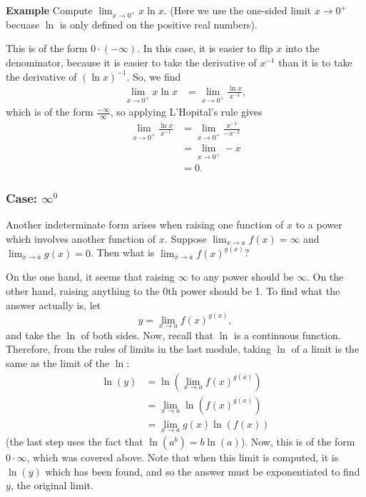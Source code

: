 \documentclass[twoside,openright,titlepage,a4paper]{book}
\begin{document}
\begin{sloppypar}
\textbf{Example} Compute $\displaystyle \lim_{x \rightarrow 0^+} x \ln x$. (Here we use the one-sided limit $x \rightarrow 0^+$ becuase $\ln$ is only defined on the positive real numbers).
\begin{examplebox}
This is of the form $0 \cdot (-\infty)$. In this case, it is easier to flip $x$ into the denominator, because it is easier to take the derivative of $x^{-1}$ than it is to take the derivative of $(\ln x)^{-1}$. So, we find
\begin{align*}
\lim_{x \rightarrow 0^+} x \ln x &= \lim_{x \rightarrow 0^+} \frac{ \ln x}{x^{-1}},
\end{align*}
which is of the form $\frac{-\infty}{\infty}$, so applying L'Hopital's rule gives
\begin{align*}
\lim_{x \rightarrow 0^+} \frac{ \ln x}{x^{-1}} &= \lim_{x \rightarrow 0^+} \frac{x^{-1}}{-x^{-2}} \\
&= \lim_{x \rightarrow 0^+} -x \\
&= 0.
\end{align*} 
\end{examplebox}

\subsubsection{Case: $\infty^0$}

Another indeterminate form arises when raising one function of $x$ to a power which involves another function of $x$. Suppose $\displaystyle \lim_{x \rightarrow a} f(x) = \infty$ and $\displaystyle \lim_{x \rightarrow a} g(x) = 0$. Then what is $\displaystyle \lim_{x \rightarrow a} f(x)^{g\left(x\right)}$?

On the one hand, it seems that raising $\infty$ to any power should be $\infty$. On the other hand, raising anything to the 0th power should be 1. To find what the answer actually is, let \[ y = \lim_{x \rightarrow a} f(x)^{g\left(x\right)}, \] and take the $\ln$ of both sides. Now, recall that $\ln$ is a continuous function. Therefore, from the rules of limits in the last module, taking $\ln$ of a limit is the same as the limit of the $\ln$:
\begin{align*}
\ln(y) &= \ln\left(\lim_{x\rightarrow a} f(x)^{g\left(x\right)}\right) \\
&= \lim_{x \rightarrow a} \ln \left(f(x)^{g\left(x\right)}\right) \\
&= \lim_{x \rightarrow a} g(x) \ln(f(x))
\end{align*}
(the last step uses the fact that $\ln(a^b) = b\ln(a)$). Now, this is of the form $0 \cdot \infty$, which was covered above. Note that when this limit is computed, it is $\ln(y)$ which has been found, and so the answer must be exponentiated to find $y$, the original limit.


\end{sloppypar}
\end{document}
